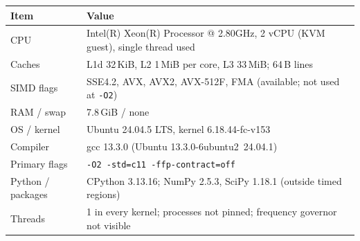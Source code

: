 \begin{tabular}{@{}lp{11cm}@{}}
\toprule
Item & Value \\
\midrule
CPU & Intel(R) Xeon(R) Processor @ 2.80GHz, 2 vCPU (KVM guest), single thread used \\
Caches & L1d 32\,KiB, L2 1\,MiB per core, L3 33\,MiB; 64\,B lines \\
SIMD flags & SSE4.2, AVX, AVX2, AVX-512F, FMA (available; not used at \texttt{-O2}) \\
RAM / swap & 7.8\,GiB / none \\
OS / kernel & Ubuntu 24.04.5 LTS, kernel 6.18.44-fc-v153 \\
Compiler & gcc 13.3.0 (Ubuntu 13.3.0-6ubuntu2~24.04.1) \\
Primary flags & \texttt{-O2 -std=c11 -ffp-contract=off} \\
Python / packages & CPython 3.13.16; NumPy 2.5.3, SciPy 1.18.1 (outside timed regions) \\
Threads & 1 in every kernel; processes not pinned; frequency governor not visible \\
\bottomrule
\end{tabular}
